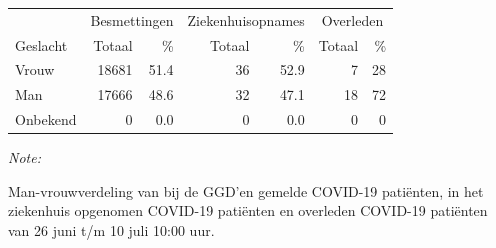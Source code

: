 \documentclass[
  english,
  man,floatsintext]{apa6}
\begin{document}
\begin{table}
\centering\begingroup\fontsize{11}{13}\selectfont

\begin{threeparttable}
\begin{tabular}{lrrrrrr}
\toprule
\multicolumn{1}{c}{ } & \multicolumn{2}{c}{Besmettingen} & \multicolumn{2}{c}{Ziekenhuisopnames} & \multicolumn{2}{c}{Overleden} \\
\cmidrule(l{3pt}r{3pt}){2-3} \cmidrule(l{3pt}r{3pt}){4-5} \cmidrule(l{3pt}r{3pt}){6-7}
Geslacht & Totaal & \% & Totaal & \% & Totaal & \%\\
\midrule
Vrouw & 18681 & 51.4 & 36 & 52.9 & 7 & 28\\
Man & 17666 & 48.6 & 32 & 47.1 & 18 & 72\\
Onbekend & 0 & 0.0 & 0 & 0.0 & 0 & 0\\
\bottomrule
\end{tabular}
\begin{tablenotes}
\item \textit{Note: } 
\item Man-vrouwverdeling van bij de GGD’en gemelde COVID-19 patiënten, in het ziekenhuis opgenomen COVID-19 patiënten en overleden COVID-19 patiënten van 26 juni t/m 10 juli 10:00 uur.
\end{tablenotes}
\end{threeparttable}
\endgroup{}
\end{table}
\newpage
\end{document}
